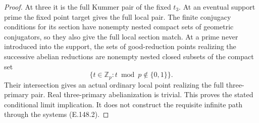 \begin{proof}
At three it is the full Kummer pair
of the fixed \(t_3\).
At an eventual support prime the
fixed point target gives the full
local pair. The finite conjugacy
conditions for its section have
nonempty nested compact sets of
geometric conjugators, so they also
give the full local section match.
At a prime never introduced into
the support, the sets of
good-reduction points realizing
the successive abelian reductions
are nonempty nested closed subsets
of the compact set
\[
 \{t\in\mathbb Z_p:
           t\bmod p\notin\{0,1\}\}.
 \]
Their intersection gives an actual
ordinary local point realizing
the full three-primary pair.
Real three-primary abelianization
is trivial.
This proves the stated conditional
limit implication. It does not
construct the requisite infinite
path through the systems
(E.148.2).
\end{proof}
